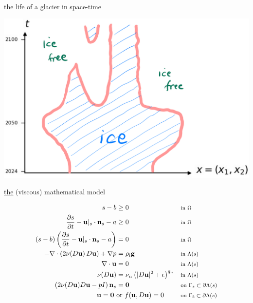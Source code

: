 \documentclass[10pt,dvipsnames]{beamer}
\newcommand{\bg}{\mathbf{g}}
\newcommand{\bn}{\mathbf{n}}
\newcommand{\bu}{\mathbf{u}}
\newcommand{\bzero}{\bm{0}}
\newcommand{\eps}{\epsilon}
\newcommand{\rhoi}{\rho_{\text{i}}}
\begin{document}
\begin{frame}{the life of a glacier in space-time}

\bigskip
\hfill \includegraphics[width=\textwidth]{xtcartoon}
\end{frame}


\newcommand{\where}[1]{\text{\footnotesize #1}}

\begin{frame}{\underline{the} (viscous) mathematical model}

\begin{align*}
s - b &\ge 0 & &\where{in $\Omega$} \\
\frac{\partial s}{\partial t} - \bu|_s \cdot \bn_s - a &\ge 0 & &\where{in $\Omega$} \\
(s - b) \left(\frac{\partial s}{\partial t} - \bu|_s \cdot \bn_s - a\right) &= 0 & &\where{in $\Omega$} \\
- \nabla \cdot \left(2 \nu(D\bu)\, D\bu\right) + \nabla p &= \rhoi \bg && \where{in $\Lambda(s)$} \\
\nabla \cdot \bu &= 0 && \where{in $\Lambda(s)$} \\
\nu(D\bu) &= \nu_n \left(|D\bu|^2 + \eps\right)^{q_n} && \where{in $\Lambda(s)$} \\
\left(2 \nu(D\bu) D\bu - pI\right) \bn_s &= \bzero && \where{on $\Gamma_s \subset \partial\Lambda(s)$} \\
\bu  = \bzero \text{ } &\text{or } f(\bu,D\bu)=0 && \where{on $\Gamma_b \subset \partial\Lambda(s)$}
\end{align*}
\end{frame}
\end{document}
